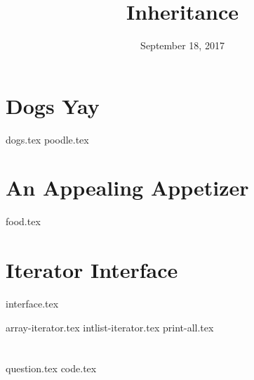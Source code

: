 \documentclass[11pt]{exam}
\title{Inheritance}
\date{September 18, 2017}
\begin{document}
\maketitle

\section{Dogs Yay}
\begin{questions}
{dogs.tex}
{poodle.tex}
\end{questions}

\clearpage

\section{An Appealing Appetizer}
\begin{questions}
{food.tex}
\end{questions}

\clearpage

\section{Iterator Interface}
{interface.tex}
\begin{questions}
{array-iterator.tex}
\clearpage
{intlist-iterator.tex}
{print-all.tex}
\end{questions}

\clearpage

\section{}
\begin{questions}
{question.tex}
{code.tex}
\end{questions}
\end{document}

